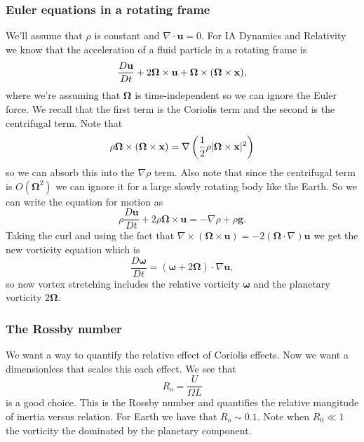 \documentclass{article}
\begin{document}
\subsubsection{Euler equations in a rotating frame}
We'll assume that $ \rho $ is constant and $ \nabla\cdot\mathbf u = 0 $. For IA Dynamics and Relativity we know that the acceleration of a fluid particle in a rotating frame is
\[
	\frac{D\mathbf u}{Dt} + 2\boldsymbol \Omega \times \mathbf u + \boldsymbol \Omega \times(\boldsymbol \Omega \times \mathbf{x}),
\]
where we're assuming that $ \boldsymbol\Omega $ is time-independent so we can ignore the Euler force. We recall that the first term is the Coriolis term and the second is the centrifugal term. Note that
\[
  \rho \boldsymbol\Omega \times(\boldsymbol\Omega \times\mathbf{x}) = \nabla\left(\frac 12 \rho|\boldsymbol \Omega \times \mathbf{x} |^2\right)
\]
so we can absorb this into the $ \nabla\rho $ term. Also note that since the centrifugal term is $ O(\boldsymbol\Omega^2) $ we can ignore it for a large slowly rotating body like the Earth. So we can write the equation for motion as
\[
	\rho \frac{D\mathbf u}{Dt} + 2\rho \boldsymbol\Omega \times\mathbf u = -\nabla\rho + \rho \mathbf g.
\]
Taking the curl and using the fact that $ \nabla\times(\boldsymbol\Omega\times\mathbf u) = -2(\boldsymbol\Omega \cdot\nabla)\mathbf u $ we get the new vorticity equation which is 
\[
	\frac{D\boldsymbol \omega }{Dt} = (\boldsymbol\omega + 2\boldsymbol \Omega) \cdot \nabla \mathbf u,
\]
so now vortex stretching includes the relative vorticity $ \boldsymbol\omega $ and the planetary vorticity $ 2\boldsymbol \Omega $.
\subsubsection{The Rossby number}
We want a way to quantify the relative effect of Coriolis effects. Now we want a dimensionless that scales this each effect. We see that
\[
	R_o = \frac U{\Omega L}
\]
is a good choice. This is the Rossby number and quantifies the relative mangitude of inertia versus relation. For Earth we have that $ R_o \sim 0.1 $. Note when $ R_0 \ll 1 $ the vorticity the dominated by the planetary component. 
\end{document}

